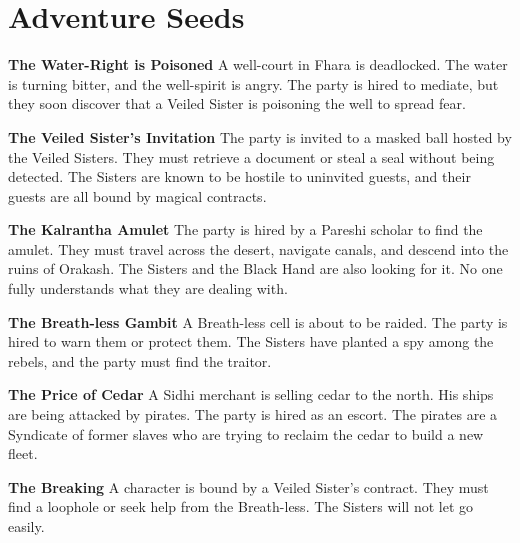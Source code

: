 \documentclass[11pt,twoside]{book}
\newenvironment{adventurebox}{\begin{mdframed}[style=adventurebox]}{\end{mdframed}}
\begin{document}
\chapter{Adventure Seeds}

\begin{adventurebox}
\textbf{The Water-Right is Poisoned}
A well-court in Fhara is deadlocked. The water is turning bitter, and the well-spirit is angry. The party is hired to mediate, but they soon discover that a Veiled Sister is poisoning the well to spread fear.
\end{adventurebox}

\begin{adventurebox}
\textbf{The Veiled Sister's Invitation}
The party is invited to a masked ball hosted by the Veiled Sisters. They must retrieve a document or steal a seal without being detected. The Sisters are known to be hostile to uninvited guests, and their guests are all bound by magical contracts.
\end{adventurebox}

\begin{adventurebox}
\textbf{The Kalrantha Amulet}
The party is hired by a Pareshi scholar to find the amulet. They must travel across the desert, navigate canals, and descend into the ruins of Orakash. The Sisters and the Black Hand are also looking for it. No one fully understands what they are dealing with.
\end{adventurebox}

\begin{adventurebox}
\textbf{The Breath-less Gambit}
A Breath-less cell is about to be raided. The party is hired to warn them or protect them. The Sisters have planted a spy among the rebels, and the party must find the traitor.
\end{adventurebox}

\begin{adventurebox}
\textbf{The Price of Cedar}
A Sidhi merchant is selling cedar to the north. His ships are being attacked by pirates. The party is hired as an escort. The pirates are a Syndicate of former slaves who are trying to reclaim the cedar to build a new fleet.
\end{adventurebox}

\begin{adventurebox}
\textbf{The Breaking}
A character is bound by a Veiled Sister's contract. They must find a loophole or seek help from the Breath-less. The Sisters will not let go easily.
\end{adventurebox}
\end{document}
